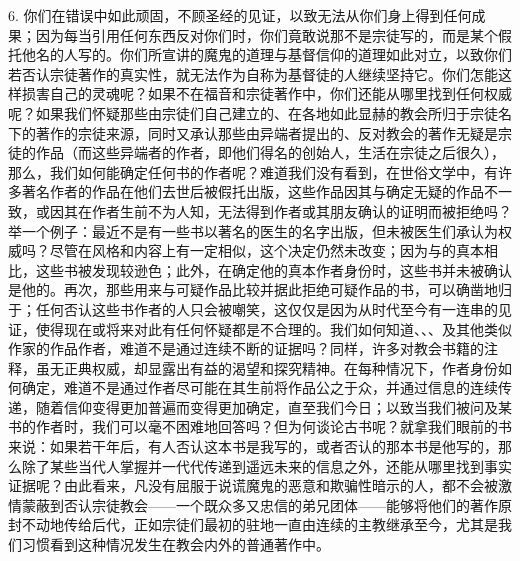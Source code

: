 6. 你们在错误中如此顽固，不顾圣经的见证，以致无法从你们身上得到任何成果；因为每当引用任何东西反对你们时，你们竟敢说那不是宗徒写的，而是某个假托他名的人写的。你们所宣讲的魔鬼的道理与基督信仰的道理如此对立，以致你们若否认宗徒著作的真实性，就无法作为自称为基督徒的人继续坚持它。你们怎能这样损害自己的灵魂呢？如果不在福音和宗徒著作中，你们还能从哪里找到任何权威呢？如果我们怀疑那些由宗徒们自己建立的、在各地如此显赫的教会所归于宗徒名下的著作的宗徒来源，同时又承认那些由异端者提出的、反对教会的著作无疑是宗徒的作品（而这些异端者的作者，即他们得名的创始人，生活在宗徒之后很久），那么，我们如何能确定任何书的作者呢？难道我们没有看到，在世俗文学中，有许多著名作者的作品在他们去世后被假托出版，这些作品因其与确定无疑的作品不一致，或因其在作者生前不为人知，无法得到作者或其朋友确认的证明而被拒绝吗？举一个例子：最近不是有一些书以著名的医生的名字出版，但未被医生们承认为权威吗？尽管在风格和内容上有一定相似，这个决定仍然未改变；因为与的真本相比，这些书被发现较逊色；此外，在确定他的真本作者身份时，这些书并未被确认是他的。再次，那些用来与可疑作品比较并据此拒绝可疑作品的书，可以确凿地归于；任何否认这些书作者的人只会被嘲笑，这仅仅是因为从时代至今有一连串的见证，使得现在或将来对此有任何怀疑都是不合理的。我们如何知道、、、及其他类似作家的作品作者，难道不是通过连续不断的证据吗？同样，许多对教会书籍的注释，虽无正典权威，却显露出有益的渴望和探究精神。在每种情况下，作者身份如何确定，难道不是通过作者尽可能在其生前将作品公之于众，并通过信息的连续传递，随着信仰变得更加普遍而变得更加确定，直至我们今日；以致当我们被问及某书的作者时，我们可以毫不困难地回答吗？但为何谈论古书呢？就拿我们眼前的书来说：如果若干年后，有人否认这本书是我写的，或者否认的那本书是他写的，那么除了某些当代人掌握并一代代传递到遥远未来的信息之外，还能从哪里找到事实证据呢？由此看来，凡没有屈服于说谎魔鬼的恶意和欺骗性暗示的人，都不会被激情蒙蔽到否认宗徒教会——一个既众多又忠信的弟兄团体——能够将他们的著作原封不动地传给后代，正如宗徒们最初的驻地一直由连续的主教继承至今，尤其是我们习惯看到这种情况发生在教会内外的普通著作中。\par

